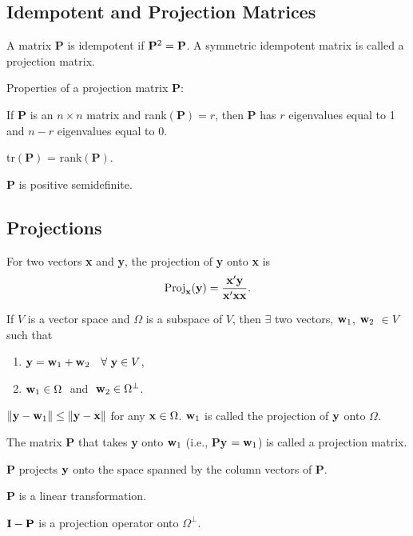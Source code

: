 \subsection{Idempotent and Projection Matrices}

\bdefi
A matrix $\mathbf P$ is idempotent if $\mathbf P^2={\bf P}$.  A
symmetric idempotent matrix is called a projection matrix.
\edefi

Properties of a projection matrix $\mathbf P$:

\bstheo
If $\mathbf P$ is an $n\times n$ matrix and rank$(\mathbf{P})=r$, then
$\mathbf P$ has $r$ eigenvalues equal to 1 and $n-r$ eigenvalues equal
to 0.
\estheo

\bstheo
tr$(\mathbf P)$ = rank$(\mathbf P)$.
\estheo

\bstheo
$\mathbf P$ is positive semidefinite.
\etheo


\subsection{Projections}

\bdefi
For two vectors {\bf x} and {\bf y}, the projection of {\bf y} onto
{\bf x} is
$$ {\rm Proj}_{\bf x}({\bf y}) = \frac{{\bf x}'{\bf y}}{{\bf x}'{\bf
x} {\bf x}}.
$$
\edefi

\bstheo
If $V$ is a vector space and $\Omega$ is a subspace of $V$, then
$\exists$ two vectors, ${\bf w}_1$, ${\bf w}_2$ $\in V$ such that
\begin{enumerate}
\item ${\bf y}= {\bf w}_1 + {\bf w}_2 \quad \forall \ {\bf y}\in V$,
\item ${\bf w}_1 \in \Omega\ $ and $\ {\bf w}_2 \in \Omega^{\perp}$.
\end{enumerate}
\estheo

\bstheo
$\|{\bf y}-{\bf w}_1\| \le \|{\bf y}-{\bf x}\|$ for any ${\bf x}\in
\Omega$.  ${\bf w}_1$ is called the projection of ${\bf y}$ onto
$\Omega$.
\estheo

\bdefi
The matrix {\bf P} that takes {\bf y} onto ${\bf w}_1$ (i.e., {\bf
P}{\bf y} $ = {\bf w}_1$) is called a projection matrix.
\edefi

\bstheo
{\bf P} projects ${\bf y}$ onto the space spanned by the column
vectors of {\bf P}.
\estheo

\bstheo
{\bf P} is a linear transformation.
\estheo

\bstheo
${\bf I}-{\bf P}$ is a projection operator onto $\Omega^{\perp}$.
\estheo


